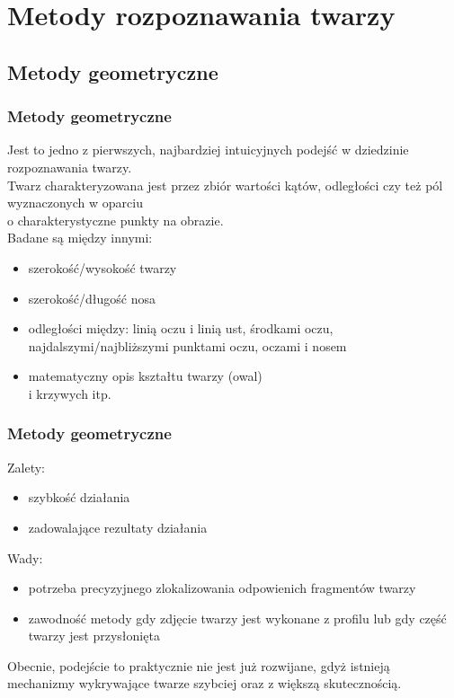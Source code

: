 \documentclass[xcolor=table]{beamer}
\begin{document}
\section{Metody rozpoznawania twarzy}

\subsection{Metody geometryczne}
\begin{frame}
  \frametitle{Metody geometryczne}

Jest to jedno z pierwszych, najbardziej intuicyjnych podejść w dziedzinie rozpoznawania twarzy. \\
Twarz charakteryzowana jest przez zbiór wartości kątów, odległości czy też pól wyznaczonych w oparciu \\
o charakterystyczne punkty na obrazie. \\
Badane są między innymi:
\begin{itemize}
\item szerokość/wysokość twarzy
\item szerokość/długość nosa
\item odległości między: linią oczu i linią ust, środkami oczu, najdalszymi/najbliższymi punktami oczu, oczami i nosem
\item matematyczny opis kształtu twarzy (owal) \\i krzywych itp.
\end{itemize}
\end{frame}

\begin{frame}
  \frametitle{Metody geometryczne}
 
Zalety:
\begin{itemize}
\item szybkość działania
\item zadowalające rezultaty działania
\end{itemize}

\vspace{10pt}
 {
Wady:
\begin{itemize}
\item potrzeba precyzyjnego zlokalizowania odpowienich fragmentów twarzy
\item zawodność metody gdy zdjęcie twarzy jest wykonane z profilu lub gdy część twarzy jest przysłonięta
\end{itemize}}

\vspace{10pt}
 {
Obecnie, podejście to praktycznie nie jest już rozwijane, gdyż istnieją mechanizmy wykrywające twarze szybciej oraz z większą skutecznością.}

\end{frame}
\end{document}
